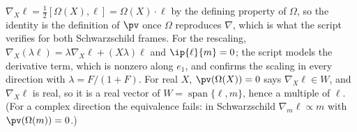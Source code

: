 $\nabla_{X}\ell = \tfrac12[\Omega(X), \ell] = \Omega(X)\cdot\ell$ by the defining property of $\Omega$, so the identity is the definition of $\pv$ once $\Omega$ reproduces $\nabla$, which is what the script verifies for both Schwarzschild frames. For the rescaling, $\nabla_{X}(\lambda\ell) = \lambda\nabla_{X}\ell + (X\lambda)\ell$ and $\ip{\ell}{m} = 0$; the script models the derivative term, which is nonzero along $e_{1}$, and confirms the scaling in every direction with $\lambda = F/(1+F)$. For real $X$, $\pv(\Omega(X)) = 0$ says $\nabla_{X}\ell \in W$, and $\nabla_{X}\ell$ is real, so it is a real vector of $W = \operatorname{span}\{\ell, m\}$, hence a multiple of $\ell$. (For a complex direction the equivalence fails: in Schwarzschild $\nabla_{m}\ell \propto m$ with $\pv(\Omega(m)) = 0$.)
